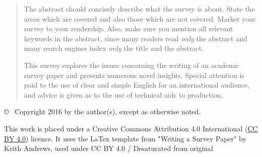 \documentclass[11pt,onecolumn,twoside]{report}
\begin{document}
\begin{titlepage}
\begin{quote}
The abstract should concisely describe what the survey is about.
State the areas which are covered and also those which are not
covered. Market your survey to your readership. Also, make sure you
mention all relevant keywords in the abstract, since many readers read
\emph{only} the abstract and many search engines index \emph{only} the
title and the abstract.

This survey explores the issues concerning the writing of an academic
survey paper and presents numerous novel insights. Special attention
is paid to the use of clear and simple English for an international
audience, and advice is given as to the use of technical aids to
production.
\end{quote}

\vfill

\begin{center}
{\small\sffamily \copyright ~ Copyright 2016 by the author(s),
except as otherwise noted.}

\vspace{2mm}
{\footnotesize\sffamily This work is placed under a
Creative Commons Attribution 4.0 International
(\href{https://creativecommons.org/licenses/by/4.0/}{CC BY 4.0}) licence. It uses the LaTex template from "Writing a Survey Paper" by Keith Andrews, used under CC BY 4.0 / Desaturated from original
}
\end{center}

\end{titlepage}




\cleardoublepage
\pagestyle{plain}



{
\setlength{\parskip}{3pt plus 3pt minus 3pt}     %
\tableofcontents
{}

\cleardoublepage
\listoffigures
{}

\cleardoublepage
\listoftables
{}

\cleardoublepage
\renewcommand{\lstlistlistingname}{List of Listings}
\lstlistoflistings
{}
}


\cleardoublepage
\pagestyle{headings}        %

\cleardoublepage


\cleardoublepage


\cleardoublepage




\cleardoublepage


\cleardoublepage


\cleardoublepage
\printbibliography[heading=bibintoc]
\end{document}
